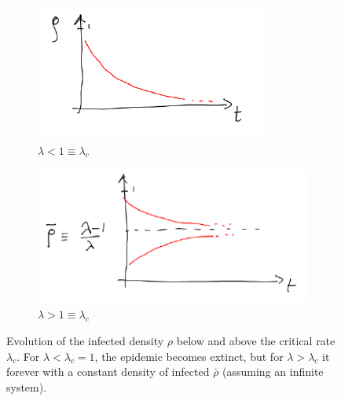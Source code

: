 \documentclass[../../main.tex]{subfiles}
\begin{document}
\begin{figure}[H]
    \centering
    \begin{subfigure}[t]{0.45\textwidth}
        \centering
        \includegraphics[width=\textwidth]{rho1.png}
        \caption{$\lambda < 1 \equiv \lambda_c$}
        \label{fig:rho-1}
    \end{subfigure}
    \hfill
    \begin{subfigure}[t]{0.45\textwidth}
        \centering
        \includegraphics[width=\textwidth]{rho2.png}
        \caption{$ \lambda > 1 \equiv \lambda_c$}
        \label{fig:rho-2}
    \end{subfigure}
       \caption{Evolution of the infected density $\rho$ below and above the critical rate $\lambda_c$. For $\lambda < \lambda_c = 1$, the epidemic becomes extinct, but for $\lambda > \lambda_c$ it  forever with a constant density of infected $\bar{\rho}$ (assuming an infinite system).}
       \label{fig:rho1-2}
\end{figure}
\end{document}
